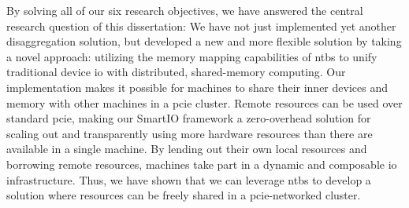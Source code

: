 By solving all of our six research objectives, we have answered the central research question of this dissertation:
\researchquestion*%
We have not just implemented yet another \gls{disaggregation} solution, but developed a new and more flexible solution by taking a novel approach:
%
utilizing the memory mapping capabilities of \glspl{ntb} to unify traditional device \gls{io} with distributed, shared-memory computing.
%
Our implementation makes it possible for machines to share their inner devices and memory with other machines in a \gls{pcie} cluster.
%
Remote resources can be used over standard \gls{pcie}, making our SmartIO framework a zero-overhead solution for scaling out and transparently using more hardware resources than there are available in a single machine.
%
By lending out their own local resources and borrowing remote resources, machines take part in a dynamic and composable \gls{io} infrastructure.
%
Thus, we have shown that we can leverage \glspl{ntb} to develop a solution where resources can be freely shared in a \gls{pcie}-networked cluster.



